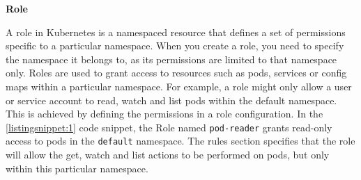 \clearpage

\textbf{Role}

A role in Kubernetes is a namespaced resource that defines a set of permissions specific to a particular namespace. When you create a role, you need to specify the namespace it belongs to, as its permissions are limited to that namespace only. Roles are used to grant access to resources such as pods, services or config maps within a particular namespace. For example, a role might only allow a user or service account to read, watch and list pods within the default namespace. This is achieved by defining the permissions in a role configuration. In the \autoref{listingsnippet:1} code snippet, the Role named \texttt{pod-reader} grants read-only access to pods in the \texttt{default} namespace. The rules section specifies that the role will allow the get, watch and list actions to be performed on pods, but only within this particular namespace. \cite{Kubernetes_doc}




